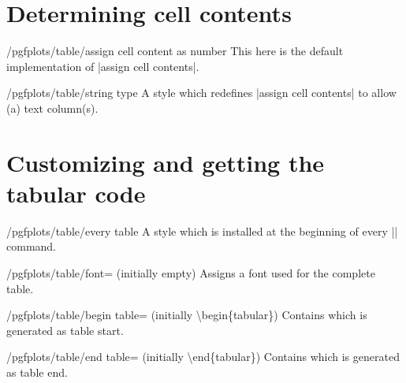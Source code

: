 \section{Determining cell contents}

\begin{key}{/pgfplots/table/assign cell content as number}
	This here is the default implementation of |assign cell contents|.
\end{key}

\begin{stylekey}{/pgfplots/table/string type}
	A style which redefines |assign cell contents| to allow (a) text column(s).
\end{stylekey}

\section{Customizing and getting the tabular code}
\begin{stylekey}{/pgfplots/table/every table}
	A style which is installed at the beginning of every |\pgfplotstabletypeset| command.
\end{stylekey}

\begin{key}{/pgfplots/table/font= (initially empty)}
	Assigns a font used for the complete table.
\end{key}

\begin{key}{/pgfplots/table/begin table= (initially \textbackslash begin\{tabular\})}
	Contains  which is generated as table start.
\end{key}
\begin{key}{/pgfplots/table/end table= (initially \textbackslash end\{tabular\})}
	Contains  which is generated as table end.
\end{key}

